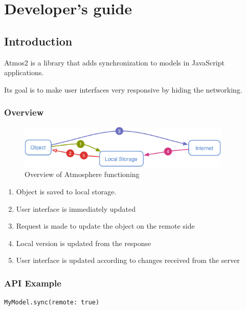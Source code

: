 \renewcommand{\thesection} {\Alph{section}}
\section{Developer's guide}

\subsection{Introduction}

Atmos2 is a library that adds synchronization to models in JavaScript applications. 

Its goal is to make user interfaces very responsive by hiding the networking. 

\subsubsection{Overview}

\begin{figure}[htbp]
  \centering
    \includegraphics[width=4in]{figures/atmos-02.png}
  \caption{Overview of Atmosphere functioning}
  \label{fig:figures_atmos-02}
\end{figure}

\begin{enumerate}
\item Object is saved to local storage. 
\item User interface is immediately updated
\item Request is made to update the object on the remote side
\item Local version is updated from the response
\item User interface is updated according to changes received from the server
\end{enumerate}

\subsubsection{API Example}

\begin{lstlisting}[caption=Fetching objects from remote source,label=list1]
MyModel.sync(remote: true)
\end{lstlisting}

